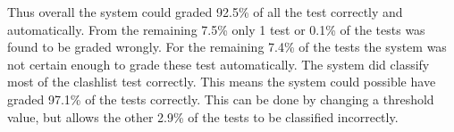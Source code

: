 Thus overall the system could graded 92.5\% of all the test correctly and automatically. From the remaining 7.5\% only 1 test or 0.1\% of the tests was found to be graded wrongly. For the remaining 7.4\% of the tests the system was not certain enough to grade these test automatically. The system did classify most of the clashlist test correctly. This means the system could possible have graded 97.1\% of the tests correctly. This can be done by changing a threshold value, but allows the other 2.9\% of the tests to be classified incorrectly.

